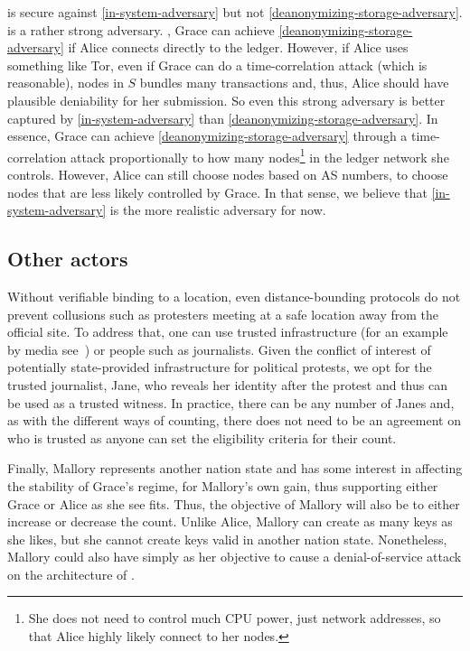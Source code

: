 \CROCUS is secure against \cref{in-system-adversary} but not 
\cref{deanonymizing-storage-adversary}.
 is a rather strong adversary.
\Eg, Grace can achieve \cref{deanonymizing-storage-adversary} if Alice connects 
directly to the ledger.
However, if Alice uses something like Tor, even if Grace can do a 
time-correlation attack (which is reasonable), nodes in \(S\) bundles many 
transactions and, thus, Alice should have plausible deniability for her 
submission.
So even this strong adversary is better captured by \cref{in-system-adversary} 
than \cref{deanonymizing-storage-adversary}.
In essence, Grace can achieve \cref{deanonymizing-storage-adversary} through a 
time-correlation attack proportionally to how many nodes\footnote{%
  She does not need to control much CPU power, just network addresses, so that 
  Alice highly likely connect to her nodes.
} in the ledger network she controls.
However, Alice can still choose nodes based on \eg AS numbers, to choose nodes 
that are less likely controlled by Grace.
In that sense, we believe that \cref{in-system-adversary} is the more realistic 
adversary for now.

\subsection{Other actors}

Without verifiable binding to a location, even distance-bounding protocols do not prevent collusions such as protesters meeting at a safe location away from the official site. 
To address that, one can use trusted infrastructure (for an example by media see~\cite{LeMondeProtestingSolution}) or people such as journalists. 
Given the conflict of interest of potentially state-provided infrastructure for political protests, we opt for the trusted journalist, Jane, who reveals her identity after the protest and thus can be used as a trusted witness. 
In practice, there can be any number of  Janes and, as with the different ways of counting, there does not need to be an agreement on who is trusted as anyone can set the eligibility criteria for their count.

Finally, Mallory represents another nation state and has some interest in affecting the stability of Grace's regime, for Mallory's own gain, thus supporting either Grace or Alice as she see fits.  
Thus, the objective of Mallory will also be to either increase or decrease the count. 
Unlike Alice, Mallory can create as many keys as she likes, but she cannot create keys valid in another nation state. 
Nonetheless, Mallory could also have simply as her objective to cause a denial-of-service attack on the architecture of \CROCUS.



